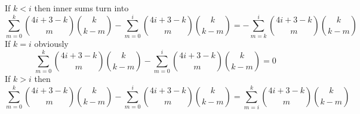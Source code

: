 If $k < i$ then inner sums turn into
\begin{equation*}
    \sum_{m=0}^{k} \binom{4i+3-k}{m} \binom{k}{k-m} - \sum_{m=0}^{i} \binom{4i+3-k}{m} \binom{k}{k-m}
    = - \sum_{m=k}^{i} \binom{4i+3-k}{m} \binom{k}{k-m}
\end{equation*}
If $k = i$ obviously
\begin{equation*}
    \sum_{m=0}^{k} \binom{4i+3-k}{m} \binom{k}{k-m} - \sum_{m=0}^{i} \binom{4i+3-k}{m} \binom{k}{k-m} = 0
\end{equation*}
If $k > i$ then
\begin{equation*}
    \sum_{m=0}^{k} \binom{4i+3-k}{m} \binom{k}{k-m} - \sum_{m=0}^{i} \binom{4i+3-k}{m} \binom{k}{k-m}
    = \sum_{m=i}^{k} \binom{4i+3-k}{m} \binom{k}{k-m}
\end{equation*}
